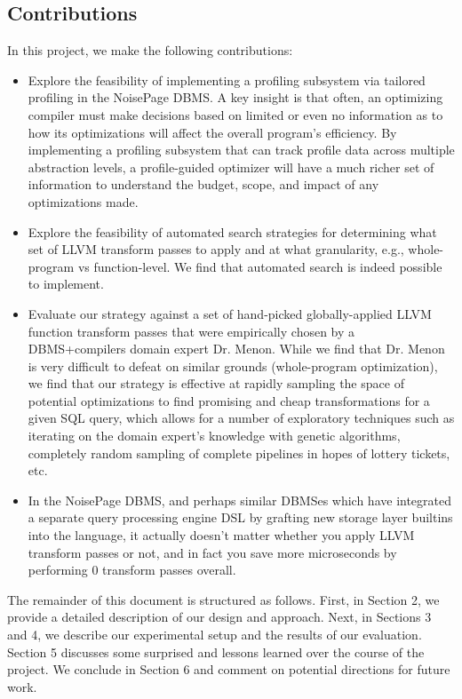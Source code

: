\documentclass{vldb}
\begin{document}
\subsection{Contributions}

In this project, we make the following contributions:

\begin{itemize}
    \item Explore the feasibility of implementing a profiling subsystem via tailored profiling \cite{beischl21} in the NoisePage DBMS. A key insight is that often, an optimizing compiler must make decisions based on limited or even no information as to how its optimizations will affect the overall program’s efficiency. By implementing a profiling subsystem that can track profile data across multiple abstraction levels, a profile-guided optimizer will have a much richer set of information to understand the budget, scope, and impact of any optimizations made. 
    \item Explore the feasibility of automated search strategies for determining what set of LLVM transform passes to apply and at what granularity, e.g., whole-program vs function-level. We find that automated search is indeed possible to implement.
    \item Evaluate our strategy against a set of hand-picked globally-applied LLVM function transform passes that were empirically chosen by a DBMS+compilers domain expert Dr. Menon. While we find that Dr. Menon is very difficult to defeat on similar grounds (whole-program optimization), we find that our strategy is effective at rapidly sampling the space of potential optimizations to find promising and cheap transformations for a given SQL query, which allows for a number of exploratory techniques such as iterating on the domain expert's knowledge with genetic algorithms, completely random sampling of complete pipelines in hopes of lottery tickets, etc.
    \item In the NoisePage DBMS, and perhaps similar DBMSes which have integrated a separate query processing engine DSL by grafting new storage layer builtins into the language, it actually doesn’t matter whether you apply LLVM transform passes or not, and in fact you save more microseconds by performing 0 transform passes overall.
\end{itemize}

The remainder of this document is structured as follows. First, in Section 2, we provide a detailed description of our design and approach. Next, in Sections 3 and 4, we describe our experimental setup and the results of our evaluation. Section 5 discusses some surprised and lessons learned over the course of the project. We conclude in Section 6 and comment on potential directions for future work.
\end{document}
